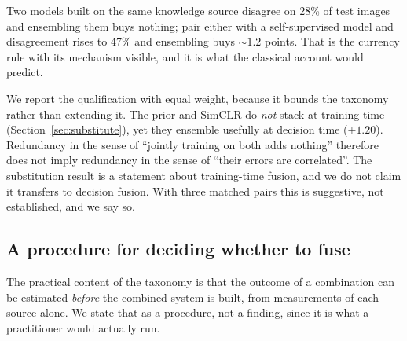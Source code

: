 Two models built on the same knowledge source disagree on 28\% of test
images and ensembling them buys nothing; pair either with a
self-supervised model and disagreement rises to 47\% and ensembling buys
${\sim}1.2$ points. That is the currency rule with its mechanism visible,
and it is what the classical account would predict.

We report the qualification with equal weight, because it bounds the
taxonomy rather than extending it. The prior and SimCLR do \emph{not} stack
at training time (Section~\ref{sec:substitute}), yet they ensemble usefully
at decision time ($+1.20$). Redundancy in the sense of ``jointly training on
both adds nothing'' therefore does not imply redundancy in the sense of
``their errors are correlated''. The substitution result is a statement
about training-time fusion, and we do not claim it transfers to decision
fusion. With three matched pairs this is suggestive, not established, and we say so.

\subsection{A procedure for deciding whether to fuse}\label{sec:procedure}
The practical content of the taxonomy is that the outcome of a combination
can be estimated \emph{before} the combined system is built, from
measurements of each source alone. We state that as a procedure, not a finding, since it is what a practitioner would actually run.

